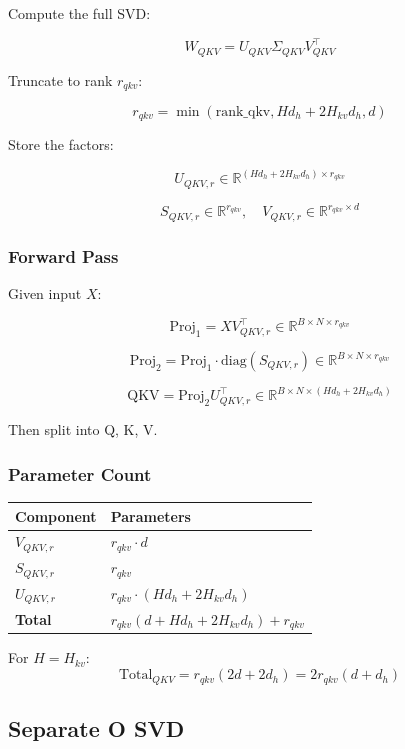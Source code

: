 Compute the full SVD:

\[
W_{QKV} = U_{QKV} \Sigma_{QKV} V_{QKV}^\top
\]

Truncate to rank $r_{qkv}$:

\[
r_{qkv} = \min(\text{rank\_qkv}, H d_h + 2 H_{kv} d_h, d)
\]

Store the factors:

\[
U_{QKV, r} \in \mathbb{R}^{(H d_h + 2 H_{kv} d_h) \times r_{qkv}}
\]

\[
S_{QKV, r} \in \mathbb{R}^{r_{qkv}}, \quad
V_{QKV, r} \in \mathbb{R}^{r_{qkv} \times d}
\]

\subsubsection{Forward Pass}

Given input $X$:

\[
\text{Proj}_1 = X V_{QKV, r}^\top \in \mathbb{R}^{B \times N \times r_{qkv}}
\]

\[
\text{Proj}_2 = \text{Proj}_1 \cdot \text{diag}(S_{QKV, r}) \in \mathbb{R}^{B \times N \times r_{qkv}}
\]

\[
\text{QKV} = \text{Proj}_2 U_{QKV, r}^\top \in \mathbb{R}^{B \times N \times (H d_h + 2 H_{kv} d_h)}
\]

Then split into Q, K, V.

\subsubsection{Parameter Count}

\begin{table}[H]
\centering
\small
\begin{tabular}{ll}
\toprule
\textbf{Component} & \textbf{Parameters} \\
\midrule
$V_{QKV, r}$ & $r_{qkv} \cdot d$ \\
$S_{QKV, r}$ & $r_{qkv}$ \\
$U_{QKV, r}$ & $r_{qkv} \cdot (H d_h + 2 H_{kv} d_h)$ \\
\textbf{Total} & $r_{qkv} (d + H d_h + 2 H_{kv} d_h) + r_{qkv}$ \\
\bottomrule
\end{tabular}
\end{table}

For $H = H_{kv}$:
\[
\text{Total}_{QKV} = r_{qkv} (2d + 2 d_h) = 2 r_{qkv} (d + d_h)
\]

\subsection{Separate O SVD}

